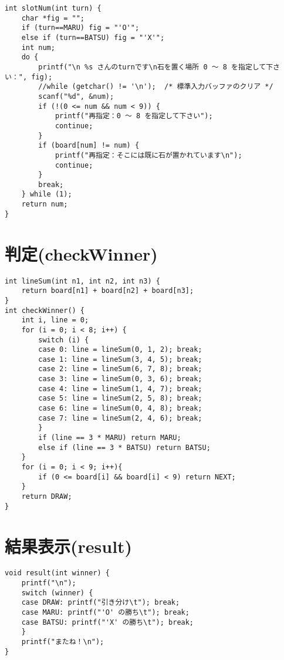 \documentclass[uplatex,a4paper,11pt,oneside,openany]{jsbook}
\begin{document}
\begin{lstlisting}
int slotNum(int turn) {
    char *fig = "";
    if (turn==MARU) fig = "'O'";
    else if (turn==BATSU) fig = "'X'";
    int num;
    do {
        printf("\n %s さんのturnです\n石を置く場所 0 〜 8 を指定して下さい：", fig);
        //while (getchar() != '\n');  /* 標準入力バッファのクリア */
        scanf("%d", &num);
        if (!(0 <= num && num < 9)) {
            printf("再指定：0 〜 8 を指定して下さい");
            continue;
        }
        if (board[num] != num) {
            printf("再指定：そこには既に石が置かれています\n");
            continue;
        }
        break;
    } while (1);
    return num;
}
\end{lstlisting}

\section{判定(checkWinner)}

\begin{lstlisting}
int lineSum(int n1, int n2, int n3) {
    return board[n1] + board[n2] + board[n3];
}
int checkWinner() {
    int i, line = 0;
    for (i = 0; i < 8; i++) {
        switch (i) {
        case 0: line = lineSum(0, 1, 2); break;
        case 1: line = lineSum(3, 4, 5); break;
        case 2: line = lineSum(6, 7, 8); break;
        case 3: line = lineSum(0, 3, 6); break;
        case 4: line = lineSum(1, 4, 7); break;
        case 5: line = lineSum(2, 5, 8); break;
        case 6: line = lineSum(0, 4, 8); break;
        case 7: line = lineSum(2, 4, 6); break;
        }
        if (line == 3 * MARU) return MARU;
        else if (line == 3 * BATSU) return BATSU;
    }
    for (i = 0; i < 9; i++){
        if (0 <= board[i] && board[i] < 9) return NEXT;
    }
    return DRAW;
}
\end{lstlisting}

\newpage

\section{結果表示(result)}

\begin{lstlisting}
void result(int winner) {
    printf("\n");
    switch (winner) {
    case DRAW: printf("引き分け\t"); break;
    case MARU: printf("'O' の勝ち\t"); break;
    case BATSU: printf("'X' の勝ち\t"); break;
    }
    printf("またね！\n");
}
\end{lstlisting}
\end{document}
